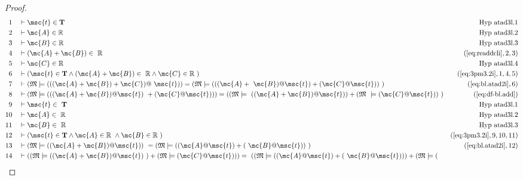 \begin{proof}
\begin{align}
  1 &&  & \vdash \msc{t} \in \mathbf{T}&\text{Hyp~atad3l.1}\notag%
  \\ 2 &&  & \vdash \mc{A} \in \mathbb{R}&\text{Hyp~atad3l.2}\notag%
  \\ 3 &&  & \vdash \mc{B} \in \mathbb{R}&\text{Hyp~atad3l.3}\notag%
  \\ 4 &&  & \vdash ( \mc{A} + \mc{B} ) \in
     ~\mathbb{R}&(\mbox{\ref{eq:readdcli}},2,3)\notag
  \\ 5 &&  & \vdash \mc{C} \in \mathbb{R}&\text{Hyp~atad3l.4}\notag%
  \\ 6 &&  & \vdash ( \msc{t} \in \mathbf{T} \wedge ( \mc{A} + \mc{B} ) \in
     ~\mathbb{R} \wedge \mc{C} \in \mathbb{R}
     ~)&(\mbox{\ref{eq:3pm3.2i}},1,4,5)\notag
  \\ 7 &&  & \vdash ( \mathfrak{M} \models ( ( ( \mc{A} + \mc{B} ) + \mc{C} ) @
     ~\msc{t} ) ) = ( \mathfrak{M} \models ( ( ( \mc{A} +
     ~\mc{B} ) @ \msc{t} ) + ( \mc{C} @ \msc{t} ) )
     ~)&(\mbox{\ref{eq:bl.atad2i}},6)\notag
  \\ 8 &&  & \vdash ( \mathfrak{M} \models ( ( ( \mc{A} + \mc{B} ) @ \msc{t} )
     ~+ ( \mc{C} @ \msc{t} ) ) ) = ( ( \mathfrak{M} \models
     ~( ( \mc{A} + \mc{B} ) @ \msc{t} ) ) + ( \mathfrak{M}
     ~\models ( \mc{C} @ \msc{t} ) )
     ~)&(\mbox{\ref{eq:df-bl.add}})\notag
  \\ 9 &&  & \vdash \msc{t} \in
     ~\mathbf{T}&\text{Hyp~atad3l.1}\notag%
  \\ 10 &&  & \vdash \mc{A} \in
     ~\mathbb{R}&\text{Hyp~atad3l.2}\notag%
  \\ 11 &&  & \vdash \mc{B} \in
     ~\mathbb{R}&\text{Hyp~atad3l.3}\notag%
  \\ 12 &&  & \vdash ( \msc{t} \in \mathbf{T} \wedge \mc{A} \in \mathbb{R}
     ~\wedge \mc{B} \in \mathbb{R}
     ~)&(\mbox{\ref{eq:3pm3.2i}},9,10,11)\notag
  \\ 13 &&  & \vdash ( \mathfrak{M} \models ( ( \mc{A} + \mc{B} ) @ \msc{t} ) )
     ~= ( \mathfrak{M} \models ( ( \mc{A} @ \msc{t} ) + (
     ~\mc{B} @ \msc{t} ) )
     ~)&(\mbox{\ref{eq:bl.atad2i}},12)\notag
  \\ 14 &&  & \vdash ( ( \mathfrak{M} \models ( ( \mc{A} + \mc{B} ) @ \msc{t} )
     ~) + ( \mathfrak{M} \models ( \mc{C} @ \msc{t} ) ) ) =
     ~( ( \mathfrak{M} \models ( ( \mc{A} @ \msc{t} ) + (
     ~\mc{B} @ \msc{t} ) ) ) + ( \mathfrak{M} \models (

\end{align}
\end{proof}
